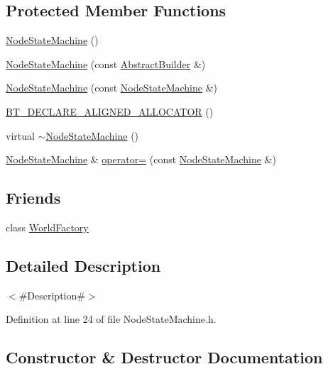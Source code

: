 \subsection*{Protected Member Functions}
\begin{DoxyCompactItemize}
\item 
\mbox{\hyperlink{classnjli_1_1_node_state_machine_a4b3f0fdd16f333096457a4c149e05a4b}{Node\+State\+Machine}} ()
\item 
\mbox{\hyperlink{classnjli_1_1_node_state_machine_a189477bb794538aa3c6fb1acd30cb643}{Node\+State\+Machine}} (const \mbox{\hyperlink{classnjli_1_1_abstract_builder}{Abstract\+Builder}} \&)
\item 
\mbox{\hyperlink{classnjli_1_1_node_state_machine_ae70ef8a7140aeebc2e9d6a0ac5c5176f}{Node\+State\+Machine}} (const \mbox{\hyperlink{classnjli_1_1_node_state_machine}{Node\+State\+Machine}} \&)
\item 
\mbox{\hyperlink{classnjli_1_1_node_state_machine_a42407b76ce190e23fe72d76fda485e57}{B\+T\+\_\+\+D\+E\+C\+L\+A\+R\+E\+\_\+\+A\+L\+I\+G\+N\+E\+D\+\_\+\+A\+L\+L\+O\+C\+A\+T\+OR}} ()
\item 
virtual \mbox{\hyperlink{classnjli_1_1_node_state_machine_a05746b8ba3e9bf38a0f955a8703b4e0e}{$\sim$\+Node\+State\+Machine}} ()
\item 
\mbox{\hyperlink{classnjli_1_1_node_state_machine}{Node\+State\+Machine}} \& \mbox{\hyperlink{classnjli_1_1_node_state_machine_a8471dc3a24a5ef783e95243472e57c44}{operator=}} (const \mbox{\hyperlink{classnjli_1_1_node_state_machine}{Node\+State\+Machine}} \&)
\end{DoxyCompactItemize}
\subsection*{Friends}
\begin{DoxyCompactItemize}
\item 
class \mbox{\hyperlink{classnjli_1_1_node_state_machine_acb96ebb09abe8f2a37a915a842babfac}{World\+Factory}}
\end{DoxyCompactItemize}


\subsection{Detailed Description}
$<$\#\+Description\#$>$ 

Definition at line 24 of file Node\+State\+Machine.\+h.



\subsection{Constructor \& Destructor Documentation}
\mbox{\label{classnjli_1_1_node_state_machine_a4b3f0fdd16f333096457a4c149e05a4b}} 
